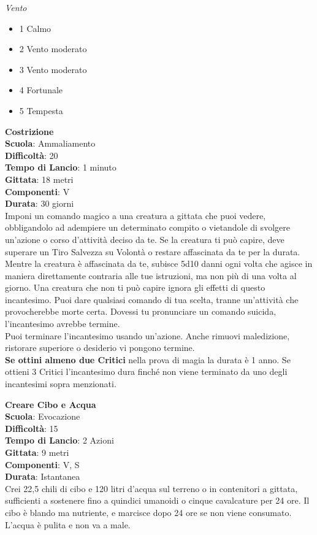 \begin{multicols}{2}
\textit{Vento}
\begin{itemize}
	\item 
1 Calmo
	\item 
2 Vento moderato
	\item 
3 Vento moderato
	\item 
4 Fortunale
	\item 
5 Tempesta
\end{itemize}

\medskip\textbf{Costrizione}\\
\textbf{Scuola}: Ammaliamento\\
\textbf{Difficoltà}:  20\\
\textbf{Tempo di Lancio}: 1 minuto\\
\textbf{Gittata}: 18 metri\\
\textbf{Componenti}: V\\
\textbf{Durata}: 30 giorni\\
Imponi un comando magico a una creatura a gittata che puoi vedere, obbligandolo ad adempiere un determinato compito o vietandole di svolgere un'azione o corso d’attività deciso da te. Se la creatura ti può capire, deve superare un Tiro Salvezza su Volontà o restare affascinata da te per la durata. Mentre la creatura è affascinata da te, subisce 5d10 danni ogni volta che agisce in maniera direttamente contraria alle tue istruzioni, ma non più di una volta al giorno. Una creatura che non ti può capire ignora gli effetti di questo incantesimo. Puoi dare qualsiasi comando di tua scelta, tranne un'attività che provocherebbe morte certa. Dovessi tu pronunciare un comando suicida, l'incantesimo avrebbe termine.\\
Puoi terminare l'incantesimo usando un'azione. Anche rimuovi maledizione, ristorare superiore o desiderio vi pongono termine.\\
\textbf{Se ottini almeno due Critici} nella prova di magia la durata è 1 anno. Se ottieni 3 Critici l'incantesimo dura finché non viene terminato da uno degli incantesimi sopra menzionati.

\medskip\textbf{Creare Cibo e Acqua}\\
\textbf{Scuola}: Evocazione\\
\textbf{Difficoltà}:  15\\
\textbf{Tempo di Lancio}: 2 Azioni\\
\textbf{Gittata}: 9 metri\\
\textbf{Componenti}: V, S\\
\textbf{Durata}: Istantanea\\
Crei 22,5 chili di cibo e 120 litri d’acqua sul terreno o in contenitori a gittata, sufficienti a sostenere fino a quindici umanoidi o cinque cavalcature per 24 ore. Il cibo è blando ma nutriente, e marcisce dopo 24 ore se non viene consumato. L’acqua è pulita e non va a male. 


\end{multicols}
